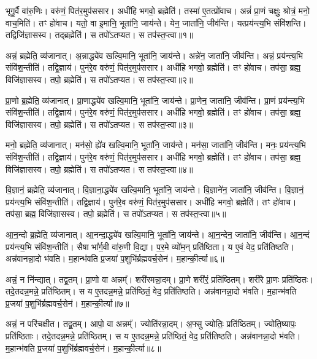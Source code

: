भृगु॒र्वै वा॑रु॒णिः। 
वरु॑णं॒ पित॑र॒मुप॑ससार। 
अधी॑हि भगवो॒ ब्रह्मेति॑। 
तस्मा॑ ए॒तत्प्रो॑वाच। 
अन्नं॑ प्रा॒णं चक्षुः॒ श्रोत्रं॒ मनो॒ वाच॒मिति॑। 
तꣳ हो॑वाच। 
यतो॒ वा इ॒मानि॒ भूता॑नि॒ जाय॑न्ते। 
येन॒ जाता॑नि॒ जीव॑न्ति। 
यत्प्रय॑न्त्य॒भि संवि॑शन्ति। 
तद्विजि॑ज्ञासस्व। 
तद्ब्रह्मेति॑। 
स तपो॑ऽतप्यत। 
स तप॑स्त॒प्त्वा॥१॥

अन्नं॒ ब्रह्मेति॒ व्य॑जानात्। 
अ॒न्नाद्ध्ये॑व खल्वि॒मानि॒ भूता॑नि॒ जाय॑न्ते। 
अन्ने॑न॒ जाता॑नि॒ जीव॑न्ति। 
अन्नं॒ प्रय॑न्त्य॒भि संवि॑श॒न्तीति॑। 
तद्वि॒ज्ञाय॑। 
पुन॑रे॒व वरु॑णं॒ पित॑र॒मुप॑ससार। 
अधी॑हि भगवो॒ ब्रह्मेति॑। 
तꣳ हो॑वाच। 
तप॑सा॒ ब्रह्म॒ विजि॑ज्ञासस्व। 
तपो॒ ब्रह्मेति॑। 
स तपो॑ऽतप्यत। 
स तप॑स्त॒प्त्वा॥२॥

प्रा॒णो ब्र॒ह्मेति॒ व्य॑जानात्। 
प्रा॒णाद्ध्ये॑व खल्वि॒मानि॒ भूता॑नि॒ जाय॑न्ते। 
प्रा॒णेन॒ जाता॑नि॒ जीव॑न्ति। 
प्रा॒णं प्रय॑न्त्य॒भि संवि॑श॒न्तीति॑। 
तद्वि॒ज्ञाय॑। 
पुन॑रे॒व वरु॑णं॒ पित॑र॒मुप॑ससार। 
अधी॑हि भगवो॒ ब्रह्मेति॑। 
तꣳ हो॑वाच। 
तप॑सा॒ ब्रह्म॒ विजि॑ज्ञासस्व। 
तपो॒ ब्रह्मेति॑। 
स तपो॑ऽतप्यत। 
स तप॑स्त॒प्त्वा॥३॥

मनो॒ ब्रह्मेति॒ व्य॑जानात्। 
मन॑सो॒ ह्ये॑व खल्वि॒मानि॒ भूता॑नि॒ जाय॑न्ते। 
मन॑सा॒ जाता॑नि॒ जीव॑न्ति। 
मनः॒ प्रय॑न्त्य॒भि संवि॑श॒न्तीति॑। 
तद्वि॒ज्ञाय॑। 
पुन॑रे॒व वरु॑णं॒ पित॑र॒मुप॑ससार। 
अधी॑हि भगवो॒ ब्रह्मेति॑। 
तꣳ हो॑वाच। 
तप॑सा॒ ब्रह्म॒ विजि॑ज्ञासस्व। 
तपो॒ ब्रह्मेति॑। 
स तपो॑ऽतप्यत। 
स तप॑स्त॒प्त्वा॥४॥

वि॒ज्ञानं॒ ब्रह्मेति॒ व्य॑जानात्। 
वि॒ज्ञाना॒द्ध्ये॑व खल्वि॒मानि॒ भूता॑नि॒ जाय॑न्ते। 
वि॒ज्ञाने॑न॒ जाता॑नि॒ जीव॑न्ति। 
वि॒ज्ञानं॒ प्रय॑न्त्य॒भि संवि॑श॒न्तीति॑। 
तद्वि॒ज्ञाय॑। 
पुन॑रे॒व वरु॑णं॒ पित॑र॒मुप॑ससार। 
अधी॑हि भगवो॒ ब्रह्मेति॑। 
तꣳ हो॑वाच। 
तप॑सा॒ ब्रह्म॒ विजि॑ज्ञासस्व। 
तपो॒ ब्रह्मेति॑। 
स तपो॑ऽतप्यत। 
स तप॑स्त॒प्त्वा॥५॥

आ॒न॒न्दो ब्र॒ह्मेति॒ व्य॑जानात्। 
आ॒नन्दा॒द्ध्ये॑व खल्वि॒मानि॒ भूता॑नि॒ जाय॑न्ते। 
आ॒न॒न्देन॒ जाता॑नि॒ जीव॑न्ति। 
आ॒न॒न्दं प्रय॑न्त्य॒भि संवि॑श॒न्तीति॑। 
सैषा भा᳚र्ग॒वी वा॑रु॒णी वि॒द्या। 
प॒र॒मे व्यो॑म॒न् प्रति॑ष्ठिता। 
य ए॒वं वेद॒ प्रति॑तिष्ठति। 
अन्न॑वानन्ना॒दो भ॑वति। 
म॒हान्भ॑वति प्र॒जया॑ प॒शुभि॑र्ब्रह्मवर्च॒सेन॑। 
म॒हान्की॒र्त्या॥६॥

अन्नं॒ न नि॑न्द्यात्। 
तद्व्र॒तम्। 
प्रा॒णो वा अन्नम्᳚। 
शरी॑रमन्ना॒दम्। 
प्रा॒णे शरी॑रं॒ प्रति॑ष्ठितम्। 
शरी॑रे प्रा॒णः प्रति॑ष्ठितः। 
तदे॒तदन्न॒मन्ने॒ प्रति॑ष्ठितम्। 
स य ए॒तदन्न॒मन्ने॒ प्रति॑ष्ठितं॒ वेद॒ प्रति॑तिष्ठति। 
अन्न॑वानन्ना॒दो भ॑वति। 
म॒हान्भ॑वति प्र॒जया॑ प॒शुभि॑र्ब्रह्मवर्च॒सेन॑। 
म॒हान्की॒र्त्या॥७॥

अन्नं॒ न परि॑चक्षीत। 
तद्व्र॒तम्। 
आपो॒ वा अन्नम्᳚। 
ज्योति॑रन्ना॒दम्। 
अ॒फ्सु ज्योतिः॒ प्रति॑ष्ठितम्। 
ज्योति॒ष्यापः॒ प्रति॑ष्ठिताः। 
तदे॒तदन्न॒मन्ने॒ प्रति॑ष्ठितम्। 
स य ए॒तदन्न॒मन्ने॒ प्रति॑ष्ठितं॒ वेद॒ प्रति॑तिष्ठति। 
अन्न॑वानन्ना॒दो भ॑वति। 
म॒हान्भ॑वति प्र॒जया॑ प॒शुभि॑र्ब्रह्मवर्च॒सेन॑। 
म॒हान्की॒र्त्या॥८॥

